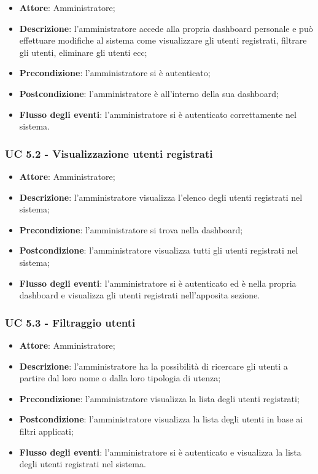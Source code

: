 \begin{itemize}
\item \textbf{Attore}: Amministratore; 
\item \textbf{Descrizione}: l'amministratore accede alla propria dashboard personale e può effettuare modifiche al sistema come  visualizzare gli utenti registrati, filtrare gli utenti, eliminare gli utenti ecc;
\item \textbf{Precondizione}: l'amministratore si è autenticato;
\item \textbf{Postcondizione}: l'amministratore è all'interno della sua dashboard;
\item \textbf{Flusso degli eventi}: l'amministratore si è autenticato correttamente nel sistema.
\end{itemize}

\subsubsection{UC 5.2 - Visualizzazione utenti registrati}

\begin{itemize}
\item \textbf{Attore}: Amministratore;
\item \textbf{Descrizione}: l'amministratore visualizza l'elenco degli utenti registrati nel sistema;
\item \textbf{Precondizione}: l'amministratore si trova nella dashboard;
\item \textbf{Postcondizione}: l'amministratore visualizza tutti gli utenti registrati nel sistema;
\item \textbf{Flusso degli eventi}: l'amministratore si è autenticato ed è nella propria dashboard e visualizza gli utenti registrati nell'apposita sezione.
\end{itemize}

\subsubsection{UC 5.3 - Filtraggio utenti}
\begin{itemize}
\item \textbf{Attore}: Amministratore;
\item \textbf{Descrizione}: l'amministratore ha la possibilità di ricercare gli utenti a partire dal loro nome o dalla loro tipologia di utenza;
\item \textbf{Precondizione}: l'amministratore visualizza la lista degli utenti registrati;
\item \textbf{Postcondizione}: l'amministratore visualizza la lista degli utenti in base ai filtri applicati;
\item \textbf{Flusso degli eventi}: l'amministratore si è autenticato e visualizza la lista degli utenti registrati nel sistema.
\end{itemize}


